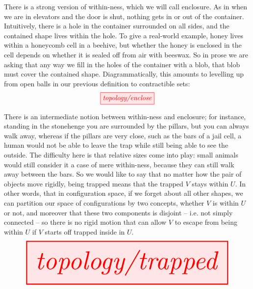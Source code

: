 \begin{myboxR}
\begin{defn}\label{defn:containment}
There is a strong version of within-ness, which we will call enclosure. As in when we are in elevators and the door is shut, nothing gets in or out of the container. Intuitively, there is a hole in the container surrounded on all sides, and the contained shape lives within the hole. To give a real-world example, honey lives within a honeycomb cell in a beehive, but whether the honey is enclosed in the cell depends on whether it is sealed off from air with beeswax. So in prose we are asking that any way we fill in the holes of the container with a blob, that blob must cover the contained shape. Diagrammatically, this amounts to levelling up from open balls in our previous definition to contractible sets:
\[\tikzfig{topology/enclose}\]
\end{defn}
\end{myboxR}


\begin{myboxB}
\begin{defn}[Trapping]\label{defn:trapped}
There is an intermediate notion between within-ness and enclosure; for instance, standing in the stonehenge you are surrounded by the pillars, but you can always walk away, whereas if the pillars are very close, such as the bars of a jail cell, a human would not be able to leave the trap while still being able to see the outside. The difficulty here is that relative sizes come into play: small animals would still consider it a case of mere within-ness, because they can still walk away between the bars. So we would like to say that no matter how the pair of objects move rigidly, being trapped means that the trapped $V$ stays within $U$. In other words, that in configuration space, if we forget about all other shapes, we can partition our space of configurations by two concepts, whether $V$ is within $U$ or not, and moreover that these two components is disjoint -- i.e. not simply connected -- so there is no rigid motion that can allow $V$ to escape from being within $U$ if $V$ starts off trapped inside in $U$.
\[\resizebox{\textwidth}{!}{\tikzfig{topology/trapped}}\]
\end{defn}
\end{myboxB}

